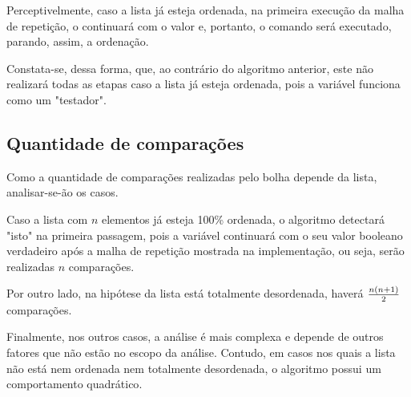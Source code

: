 Perceptivelmente, caso a lista já esteja ordenada, na primeira execução da malha de repetição, o  continuará com o valor  e, portanto, o comando  será executado, parando, assim, a ordenação.

Constata-se, dessa forma, que, ao contrário do algoritmo anterior, este não realizará todas as etapas caso a lista já esteja ordenada, pois a variável  funciona como um "testador".

\subsection{Quantidade de comparações}
Como a quantidade de comparações realizadas pelo bolha depende da lista, analisar-se-ão os casos. 

Caso a lista com $n$ elementos já esteja 100\% ordenada, o algoritmo detectará "isto" na primeira passagem, pois a variável  continuará com o seu valor booleano verdadeiro após a malha de repetição mostrada na implementação, ou seja, serão realizadas $n$ comparações.

Por outro lado, na hipótese da lista está totalmente desordenada, haverá $n(n+1)\over 2$ comparações. 

Finalmente, nos outros casos, a análise é mais complexa e depende de outros fatores que não estão no escopo da análise. Contudo, em casos nos quais a lista não está nem ordenada nem totalmente desordenada, o algoritmo possui um comportamento quadrático\cite{bubblecomplexity}.
